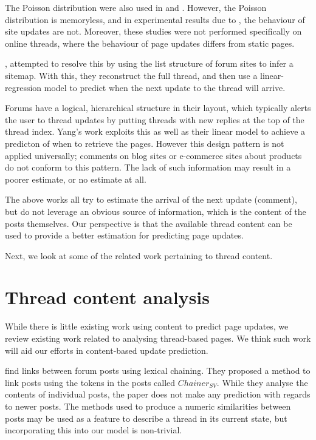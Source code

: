 The Poisson distribution were also used in  and 
. %
However, the Poisson distribution is memoryless, and in experimental results due 
to , the behaviour of site updates are not. Moreover, these 
studies were not performed specifically on online threads, where the behaviour 
of page updates differs from static pages.

, attempted to resolve this by using the list structure of 
forum sites to infer a sitemap. With this, they reconstruct the full thread, and 
then use a linear-regression model to predict when the next update to the thread 
will arrive. 

Forums have a logical, hierarchical structure in their 
layout, which typically alerts the user to thread updates by putting threads 
with new replies at the top of the thread index. Yang's work exploits this 
as well as their linear model to achieve a predicton of when to retrieve the 
pages.
However this design pattern is not applied universally; 
comments on blog sites 
or e-commerce sites about products do not conform to this pattern.  The lack of such 
information may result in a poorer estimate, or no estimate at all.

The above works all try to estimate the arrival of the next update (comment), but do not leverage an obvious source of information, which is the content of the posts themselves. Our perspective
is that the available thread content can be used to provide a better estimation for predicting page updates. 

Next, we look at some of the related work
pertaining to thread content.

\section{Thread content analysis}
While there is little existing work using content to predict page updates, we 
review existing work related to analysing thread-based pages.  We 
think such work will aid our efforts in content-based update prediction.

 find links between forum posts using 
lexical chaining. They proposed a method to link posts using the tokens in the 
posts called $Chainer_{SV}$. While they analyse the contents of individual 
posts, the paper does not make any prediction with regards to newer posts. The 
methods used to produce a numeric similarities between posts may be used as a 
feature to describe a thread in its current state, 
but incorporating this into 
our model is non-trivial.

